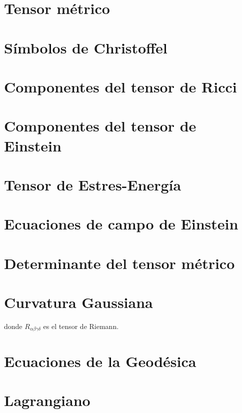 \documentclass{article}%
\begin{document}
%



\section*{Tensor métrico}


\section*{Símbolos de Christoffel}


\section*{Componentes del tensor de Ricci}


\section*{Componentes del tensor de Einstein}


\section*{Tensor de Estres-Energía}


\section*{Ecuaciones de campo de Einstein}


\section*{Determinante del tensor métrico}


\section*{Curvatura Gaussiana}


donde $R_{\alpha\beta\gamma\delta}$ es el tensor de Riemann.


\section*{Ecuaciones de la Geodésica}





\section*{Lagrangiano}

\end{document}

